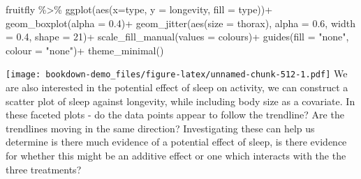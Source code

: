 \documentclass[
]{book}
\newenvironment{Shaded}{\begin{snugshade}}{\end{snugshade}}
\newcommand{\AttributeTok}[1]{\textcolor[rgb]{0.77,0.63,0.00}{#1}}
\newcommand{\DecValTok}[1]{\textcolor[rgb]{0.00,0.00,0.81}{#1}}
\newcommand{\FloatTok}[1]{\textcolor[rgb]{0.00,0.00,0.81}{#1}}
\newcommand{\FunctionTok}[1]{\textcolor[rgb]{0.00,0.00,0.00}{#1}}
\newcommand{\NormalTok}[1]{#1}
\newcommand{\SpecialCharTok}[1]{\textcolor[rgb]{0.00,0.00,0.00}{#1}}
\newcommand{\StringTok}[1]{\textcolor[rgb]{0.31,0.60,0.02}{#1}}
\begin{document}
\begin{Shaded}
\begin{Highlighting}[]
\NormalTok{fruitfly }\SpecialCharTok{\%\textgreater{}\%} 
  \FunctionTok{ggplot}\NormalTok{(}\FunctionTok{aes}\NormalTok{(}\AttributeTok{x=}\NormalTok{type, }\AttributeTok{y =}\NormalTok{ longevity, }\AttributeTok{fill =}\NormalTok{ type))}\SpecialCharTok{+}
  \FunctionTok{geom\_boxplot}\NormalTok{(}\AttributeTok{alpha =} \FloatTok{0.4}\NormalTok{)}\SpecialCharTok{+}
  \FunctionTok{geom\_jitter}\NormalTok{(}\FunctionTok{aes}\NormalTok{(}\AttributeTok{size =}\NormalTok{ thorax),}
              \AttributeTok{alpha =} \FloatTok{0.6}\NormalTok{,}
              \AttributeTok{width =} \FloatTok{0.4}\NormalTok{,}
              \AttributeTok{shape =} \DecValTok{21}\NormalTok{)}\SpecialCharTok{+}
  \FunctionTok{scale\_fill\_manual}\NormalTok{(}\AttributeTok{values =}\NormalTok{ colours)}\SpecialCharTok{+}
    \FunctionTok{guides}\NormalTok{(}\AttributeTok{fill =} \StringTok{"none"}\NormalTok{,}
         \AttributeTok{colour =} \StringTok{"none"}\NormalTok{)}\SpecialCharTok{+}
  \FunctionTok{theme\_minimal}\NormalTok{()}
\end{Highlighting}
\end{Shaded}

\texttt{[image: bookdown-demo\_files/figure-latex/unnamed-chunk-512-1.pdf]}
We are also interested in the potential effect of sleep on activity, we can construct a scatter plot of sleep against longevity, while including body size as a covariate. In these faceted plots - do the data points appear to follow the trendline? Are the trendlines moving in the same direction? Investigating these can help us determine is there much evidence of a potential effect of sleep, is there evidence for whether this might be an additive effect or one which interacts with the the three treatments?
\end{document}
